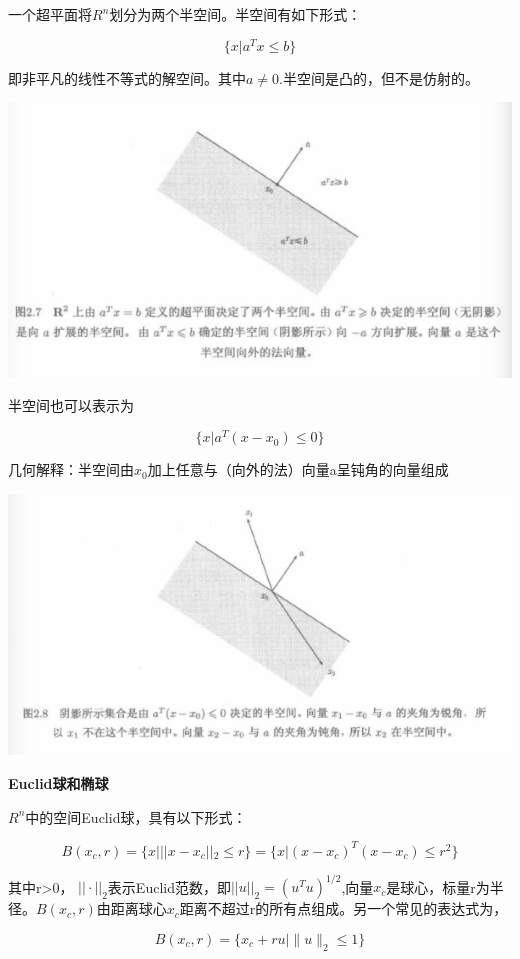 \documentclass{ctexart}
\begin{document}
	一个超平面将\(R^n\)划分为两个半空间。半空间有如下形式：
	
	\[\{x|a^Tx \leq b\}\]
	
	即非平凡的线性不等式的解空间。其中\(a \neq 0\).半空间是凸的，但不是仿射的。
	
	\includegraphics[width=1\linewidth]{pic/pic2_7}
	
	半空间也可以表示为
	
	\[\{x|a^T(x-x_0) \leq 0\}\]
	
	几何解释：半空间由\(x_0\)加上任意与（向外的法）向量a呈钝角的向量组成 
	
	\includegraphics[width=1\linewidth]{pic/pic2_8}
	
	\textbf{Euclid球和椭球}
	
	\(R^n\)中的空间Euclid球，具有以下形式：
	
	\[B(x_c, r)=\{x | ||x-x_c||_2 \leq r\}=\{x|(x-x_c)^T(x-x_c) \leq r^2\}\]
	
	其中r>0， \(||·||_2\)表示Euclid范数，即\(||u||_2=(u^Tu)^{1/2}\),向量\(x_c\)是球心，标量r为半径。\(B(x_c, r)\)由距离球心\(x_c\)距离不超过r的所有点组成。另一个常见的表达式为，
	
	\[B(x_c, r)=\{x_c+ru| \parallel u\parallel_2 \leq 1\}\]
	
\end{document}
